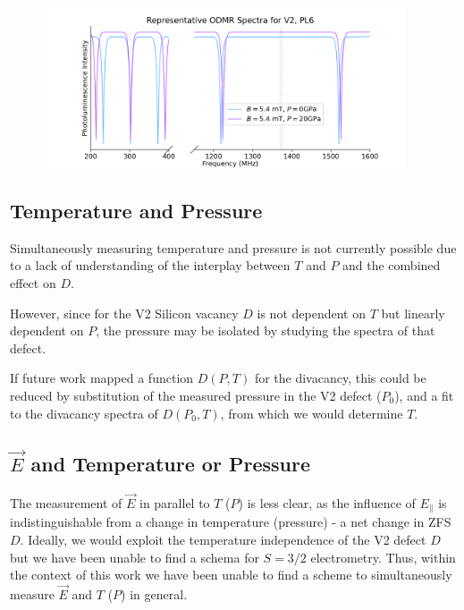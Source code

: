 \begin{figure}[h]
	\begin{center}
		\includegraphics[width=0.95\textwidth]{figures/ODMR-multimodal-s15magnet-s1P.png}
	\end{center}
	\caption{}\label{fig:multimode_BP}
\end{figure}

\subsection{Temperature and Pressure}
Simultaneously measuring temperature and pressure is not currently possible due to a lack of understanding of the interplay between $T$ and $P$ and the combined effect on $D$.

However, since for the V2 Silicon vacancy $D$ is not dependent on $T$ but linearly dependent on $P$, the pressure may be isolated by studying the spectra of that defect.

If future work mapped a function $D(P,T)$ for the divacancy, this could be reduced by substitution of the measured pressure in the V2 defect ($P_0$), and a fit to the divacancy spectra of $D(P_0, T)$, from which we would determine $T$.

\subsection{$\vec{E}$ and Temperature or Pressure}\label{multi-E-pressure}
The measurement of $\vec{E}$ in parallel to $T$ ($P$) is less clear, as the influence of $E_\parallel$ is indistinguishable from a change in temperature (pressure) - a net change in ZFS $D$. Ideally, we would exploit the temperature independence of the V2 defect $D$ but we have been unable to find a schema for $S=3/2$ electrometry. 
Thus, within the context of this work we have been unable to find a scheme to simultaneously measure $\vec{E}$ and $T$ ($P$) in general.  

